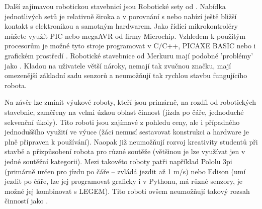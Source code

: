 
Další zajímavou robotickou stavebnicí jsou Robotické sety od  \cite{merkur_roboticsSetsEshop}. 
Nabídka jednotlivých setů je relativně široka a v porovnání s \legoM{ }nebo \fischerT{ }nabízí ještě bližší kontakt s elektronikou a samotným hardwarem. 
Jako řídící mikrokontroléry můžete využít PIC nebo megaAVR od firmy Microchip. 
Vzhledem k použitým procesorům je možné tyto stroje programovat v C/C++, PICAXE BASIC nebo i grafickém prostředí \cite{picaxeCz_BlocklyForPICAXE}. 
Robotické stavebnice od Merkuru mají podobné 'problémy' jako \fischerT. 
Kladou na uživatele větší nároky, nemají tak zvučnou značku, mají omezenější základní sadu senzorů a neumožňují tak rychlou stavbu fungujícího robota.

Na závěr lze zmínit výukové roboty, kteří jsou primárně, na rozdíl od robotických stavebnic, zaměřeny na velmi úzkou oblast činnost (jízda po čáře, jednoduché sekvenční úkoly). 
Tito roboti jsou zajímavé z pohledu ceny, ale i případného jednoduššího využití ve výuce (žáci nemusí sestavovat konstrukci a hardware je plně připraven k používání). 
Naopak již neumožňují rozvoj kreativity studentů při stavbě a přizpůsobení robota pro různé soutěže (většinou je lze využívat jen v jedné soutěžní kategorii).  
Mezi takovéto roboty patři například Pololu 3pi \cite{robotPololu3pi} (primárně určen pro jízdu po čáře -- zvládá jezdit až 1 m/s) nebo Edison \cite{robotEdison} (umí jezdit po čáře, lze jej programovat graficky i v Pythonu, má různé senzory, je možné jej kombinovat s LEGEM). 
Tito roboti ovšem neumožňují takový rozsah činností jako \legoM.

